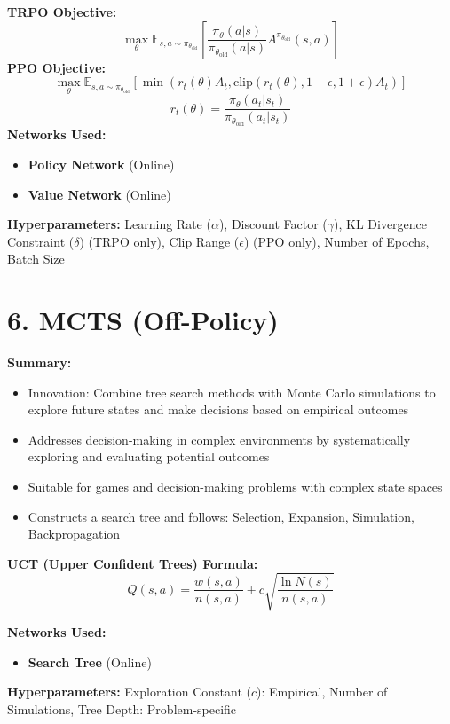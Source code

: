 \documentclass[letterpaper,10pt]{article}
\begin{document}
\begin{multicols}{2}
\noindent \textbf{TRPO Objective:}
\[
\max_\theta \mathbb{E}_{s, a \sim \pi_{\theta_{\text{old}}}} \left[ \frac{\pi_\theta(a|s)}{\pi_{\theta_{\text{old}}}(a|s)} A^{\pi_{\theta_{\text{old}}}}(s, a) \right]
\]
\textbf{PPO Objective:}
\[
\max_\theta \mathbb{E}_{s, a \sim \pi_{\theta_{\text{old}}}} \left[ \min\left( r_t(\theta) A_t, \text{clip}(r_t(\theta), 1-\epsilon, 1+\epsilon) A_t \right) \right]
\]
\[
r_t(\theta) = \frac{\pi_\theta(a_t | s_t)}{\pi_{\theta_{\text{old}}}(a_t | s_t)}
\]
\textbf{Networks Used:}
\begin{itemize}
    \item \textbf{Policy Network} (Online)
    \item \textbf{Value Network} (Online)
\end{itemize}
\textbf{Hyperparameters: }Learning Rate (\(\alpha\)), Discount Factor (\(\gamma\)), KL Divergence Constraint (\(\delta\)) (TRPO only), Clip Range (\(\epsilon\)) (PPO only), Number of Epochs, Batch Size

\section*{6. MCTS (Off-Policy)}
\textbf{Summary:}
\begin{itemize}
    \item Innovation: Combine tree search methods with Monte Carlo simulations to explore future states and make decisions based on empirical outcomes
    \item Addresses decision-making in complex environments by systematically exploring and evaluating potential outcomes
    \item Suitable for games and decision-making problems with complex state spaces
    \item Constructs a search tree and follows: Selection, Expansion, Simulation, Backpropagation
\end{itemize}

\noindent \textbf{UCT (Upper Confident Trees) Formula:}
\[
Q(s, a) = \frac{w(s, a)}{n(s, a)} + c \sqrt{\frac{\ln N(s)}{n(s, a)}}
\]

\noindent \textbf{Networks Used:}
\begin{itemize}
    \item \textbf{Search Tree} (Online)
\end{itemize}

\noindent \textbf{Hyperparameters: }Exploration Constant (\(c\)): Empirical, Number of Simulations, Tree Depth: Problem-specific



\end{multicols}
\end{document}
